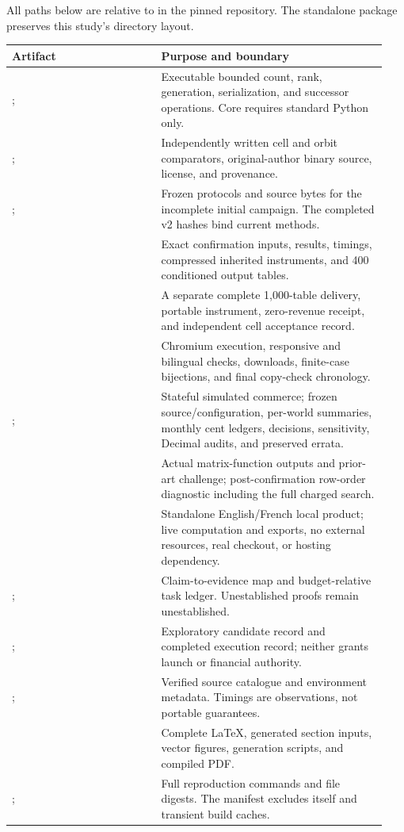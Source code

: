 All paths below are relative to
 in the pinned repository.
The standalone package preserves this study's directory layout.

\begin{longtable}{@{}P{0.37\linewidth}P{0.57\linewidth}@{}}
\toprule
Artifact & Purpose and boundary\\
\midrule
\endhead
{};  & Executable bounded count, rank, generation,
serialization, and successor operations. Core requires standard Python only.\\
;  & Independently written cell and
orbit comparators, original-author binary source, license, and provenance.\\
;  & Frozen protocols and source bytes
for the incomplete initial campaign. The completed v2 hashes bind current methods.\\
 & Exact confirmation inputs, results, timings,
compressed inherited instruments, and 400 conditioned output tables.\\
 & A separate complete 1,000-table delivery,
portable instrument, zero-revenue receipt, and independent cell acceptance record.\\
 & Chromium execution, responsive and
bilingual checks, downloads, finite-case bijections, and final copy-check chronology.\\
;  & Stateful simulated commerce; frozen
source/configuration, per-world summaries, monthly cent ledgers, decisions,
sensitivity, Decimal audits, and preserved errata.\\
 & Actual matrix-function outputs and prior-art challenge;
post-confirmation row-order diagnostic including the full charged search.\\
 & Standalone English/French local product; live
computation and exports, no external resources, real checkout, or hosting dependency.\\
;  & Claim-to-evidence
map and budget-relative task ledger. Unestablished proofs remain unestablished.\\
;  & Exploratory candidate record
and completed execution record; neither grants launch or financial authority.\\
;  & Verified source catalogue and
environment metadata. Timings are observations, not portable guarantees.\\
 & Complete LaTeX, generated section inputs, vector figures,
generation scripts, and compiled PDF.\\
;  & Full reproduction commands and
file digests. The manifest excludes itself and transient build caches.\\
\bottomrule
\end{longtable}

